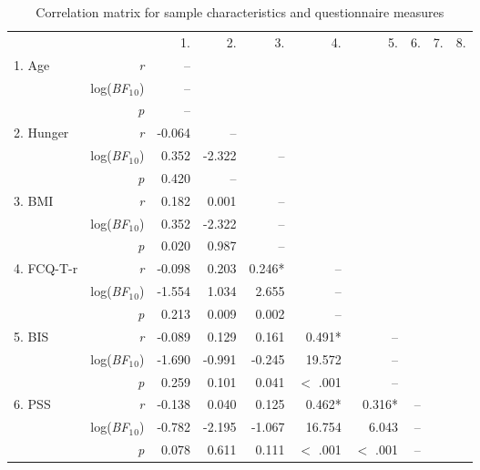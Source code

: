 \begin{appendix}
\begin{table}[h]
    \centering
    \caption{Correlation matrix for sample characteristics and questionnaire measures}
    \label{tab:cormatrix}
    {
        \begin{tabular}{lrrrrrrrrr}
            \toprule
             &  & 1. & 2. & 3. & 4. & 5. & 6. & 7. & 8.  \\
            \cmidrule(r){1-10}
             1$.$  Age & \textit{r} & -- &   &   &   &   &   &   &    \\
             & log(\textit{BF}$_{1}$$_{0}$) & -- &  &  &  &  &  &  &   \\
             & \textit{p} & -- &   &   &   &   &   &   &    \\
             2$.$ Hunger & \textit{r} & -0.064 & -- &   &   &   &   &   &    \\
             & log(\textit{BF}$_{1}$$_{0}$) & 0.352 & -2.322 & -- &  &  &  &  &   \\
             & \textit{p} & 0.420 & -- &   &   &   &   &   &    \\
             3$.$ BMI  & \textit{r} & 0.182 & 0.001 & -- &   &   &   &   &    \\
             & log(\textit{BF}$_{1}$$_{0}$) & 0.352 & -2.322 & -- &  &  &  &  &   \\
             & \textit{p} & 0.020 & 0.987 & -- &   &   &   &   &    \\
             4$.$ FCQ-T-r  & \textit{r} & -0.098 & 0.203 & 0.246* & -- &   &   &   &    \\
             & log(\textit{BF}$_{1}$$_{0}$) & -1.554 & 1.034 & 2.655 & -- &  &  &  &   \\
             & \textit{p} & 0.213 & 0.009 & 0.002 & -- &   &   &   &    \\
             5$.$ BIS  & \textit{r} & -0.089 & 0.129 & 0.161 & 0.491* & -- &   &   &    \\
             & log(\textit{BF}$_{1}$$_{0}$) & -1.690 & -0.991 & -0.245 & 19.572 & -- &  &  &   \\
             & \textit{p} & 0.259 & 0.101 & 0.041 & $<$ .001 & -- &   &   &    \\
             6$.$ PSS  & \textit{r} & -0.138 & 0.040 & 0.125 & 0.462* & 0.316* & -- &   &    \\
             & log(\textit{BF}$_{1}$$_{0}$) & -0.782 & -2.195 & -1.067 & 16.754 & 6.043 & -- &  &   \\
             & \textit{p} & 0.078 & 0.611 & 0.111 & $<$ .001 & $<$ .001 & -- &   &    \\

\end{tabular}}
\end{table}
\end{appendix}
